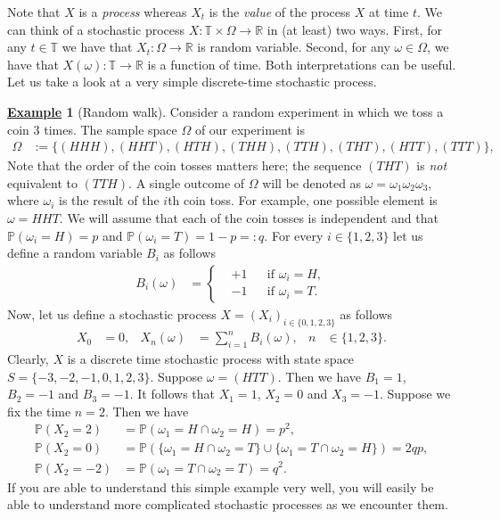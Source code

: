 \documentclass[12pt]{book}
\numberwithin{equation}{chapter}
\theoremstyle{plain}
\numberwithin{theorem}{section}
\theoremstyle{definition}
\newtheorem{example}[theorem]{\underline{Example}}
\numberwithin{exercise}{chapter}
\newcommand{\<}{\langle}
\renewcommand{\>}{\rangle}
\renewcommand{\(}{\left(}
\renewcommand{\)}{\right)}
\renewcommand{\[}{\left[}
\renewcommand{\]}{\right]}
\newcommand\Pb{\mathds{P}}
\newcommand\Rb{\mathds{R}}
\newcommand\om{\omega}
\newcommand\Om{\Omega}
\theoremstyle{definition}
\numberwithin{question}{section}
\begin{document}
\noindent
Note that $X$ is a \textit{process} whereas $X_t$ is the \textit{value} of the process $X$ at time $t$.
We can think of a stochastic process $X : \mathds{T} \times \Om \to \Rb$ in (at least) two ways.  First, for any $t \in \mathds{T}$ we have that $X_t: \Om \to \Rb$ is random variable.  Second, for any $\om \in \Om$, we have that $X(\om) : \mathds{T} \to \Rb$ is a function of time.  Both interpretations can be useful.
Let us take a look at a very simple discrete-time stochastic process.

\begin{example}[Random walk]
Consider a random experiment in which we toss a coin $3$ times.
The sample space $\Om$ of our experiment is
\begin{align}
\Om
	&:=	\{ (HHH), (HHT), (HTH), (THH), (TTH), (THT), (HTT), (TTT) \} ,
\end{align}
Note that the order of the coin tosses matters here; the sequence $(THT)$ is \textit{not} equivalent to $(TTH)$.
A single outcome of $\Om$ will be denoted as $\om =	\om_1 \om_2 \om_3$, where $\om_i$ is the result of the $i$th coin toss.  
For example, one possible element is $\om =	H H T$.
We will assume that each of the coin tosses is independent and that $\Pb(\om_i = H) = p$ and $\Pb(\om_i = T) = 1-p =:q$.
For every $i \in \{ 1, 2, 3 \}$ let us define a random variable $B_i$ as follows
\begin{align}
B_i(\om)
	&=	\left\{ \begin{aligned}
			&+1 &&\text{if $\om_i=H$} , \\
			&-1 &&\text{if $\om_i=T$} .
			\end{aligned} \right.
\end{align} 
Now, let us define a stochastic process $X = (X_i)_{i\in\{0,1,2,3\}}$ as follows
\begin{align}
X_0
	&=	0 , &
X_n(\om)
	&=	\sum_{i=1}^n B_i(\om) , &
n
	&\in \{1, 2, 3 \} .
\end{align}
Clearly, $X$ is a discrete time stochastic process with state space $S = \{-3,-2,-1,0,1,2,3\}$.
Suppose $\om = (HTT)$.
Then we have $B_1 = 1$, $B_2=-1$ and $B_3=-1$.
It follows that $X_1 = 1$, $X_2 = 0$ and $X_3=-1$.
Suppose we fix the time $n=2$.  Then we have
\begin{align}
\Pb(X_2 = 2)
	&=	\Pb( \om_1 = H \cap \om_2 = H ) = p^2 , \\
\Pb(X_2 = 0)
	&=	\Pb( \{\om_1 = H \cap \om_2 = T \} \cup \{ \om_1 = T \cap \om_2 = H \} ) = 2 qp , \\
\Pb(X_2 = -2)
	&=	\Pb( \om_1 = T \cap \om_2 = T ) = q^2 .
\end{align}
If you are able to understand this simple example very well, you will easily be able to understand more complicated stochastic processes as we encounter them.
\end{example}
\end{document}
